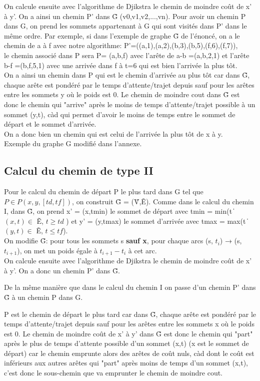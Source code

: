 \documentclass{article}
\begin{document}
On calcule ensuite avec l'algorithme de Djikstra le chemin de moindre coût de x' à y'.
On a ainsi un chemin P' dans \~G (v0,v1,v2,...,vn). Pour avoir un chemin P dans G, on prend les sommets appartenant à G qui sont visités dans P' dans le même ordre. Par exemple, si dans l'exemple de graphe \~G de l'énoncé, on a le chemin de a à f avec notre algorithme: P'=((a,1),(a,2),(b,3),(b,5),(f,6),(f,7)), \\le chemin associé dans P sera P= (a,b,f) avec l'arête de a-b =(a,b,2,1) et l'arête b-f =(b,f,5,1) avec une arrivée dans f à t=6 qui est bien l'arrivée la plus tôt.\\

On a ainsi un chemin dans P qui est le chemin d'arrivée au plus tôt car dans \~G, chaque arête est pondéré par le temps d'attente/trajet depuis sauf pour les arêtes entre les sommets y où le poids est 0. Le chemin de moindre cout dans \~G est donc le chemin qui "arrive" après le moins de temps d'attente/trajet possible à un sommet (y,t), càd qui permet d'avoir le moins de temps entre le sommet de départ et le sommet d'arrivée.\\
On a donc bien un chemin qui est celui de l'arrivée la plus tôt de x à y.\\

Exemple du graphe G modifié dans l'annexe.
\subsection*{Calcul du chemin de type II}
Pour le calcul du chemin de départ P le plus tard dans G tel que $ P \in P(x, y, [td, tf]) $, on construit  \~G  = (\~V,\~E). Comme dans le calcul du chemin I, dans \~G, on prend x' = (x,tmin) le sommet de départ avec tmin = min(t \| $ (x,t) \in $ \~E, $ t \geq td $ ) et y' = (y,tmax) le sommet d'arrivée avec tmax = max(t \| $ (y,t) \in $ \~E, $ t \leq tf $).\\
On modifie \~G: pour tous les sommets s \textbf{sauf x}, pour chaque arcs (s, $ t_{i} $) → (s, $ t_{i+1} $), on met un poids égale à $ t_{i+1} - t_{i} $ à cet arc.\\

On calcule ensuite avec l'algorithme de Djikstra le chemin de moindre coût de x' à y'. On a donc un chemin P' dans \~G.

De la même manière que dans le calcul du chemin I on passe d'un chemin P' dans \~G à un chemin P dans G.

P est le chemin de départ le plus tard car dans \~G, chaque arête est pondéré par le temps d'attente/trajet depuis sauf pour les arêtes entre les sommets x où le poids est 0. Le chemin de moindre coût de x' à y' dans \~G est donc le chemin qui "part" après le plus de temps d'attente possible d'un sommet (x,t) (x est le sommet de départ) car le chemin emprunte alors des arêtes de coût nuls, càd dont le coût est inférieurs aux autres arêtes qui "part" après moins de temps d'un sommet (x,t), c'est donc le sous-chemin que va emprunter le chemin de moindre cout.
\end{document}
